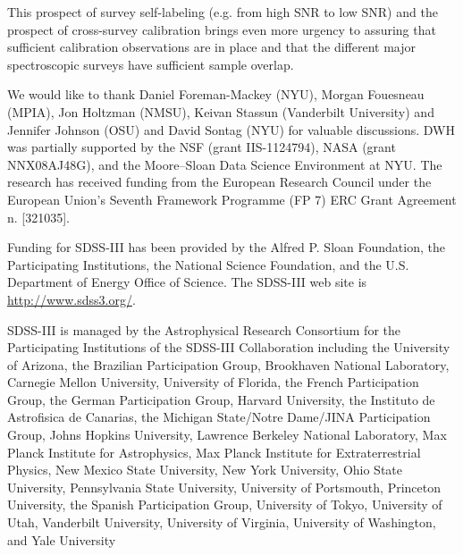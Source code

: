 \documentclass[12pt, preprint]{aastex}
\begin{document}
This prospect of survey self-labeling (e.g. from high SNR to low SNR) and the prospect of cross-survey calibration brings even more urgency to assuring that sufficient calibration observations are in place and that the different major spectroscopic surveys have sufficient sample overlap.

\acknowledgements

We would like to thank Daniel Foreman-Mackey (NYU), 
Morgan Fouesneau (MPIA), Jon Holtzman (NMSU),  Keivan Stassun (Vanderbilt University) and Jennifer Johnson (OSU) and David Sontag (NYU)
for valuable discussions.
DWH was partially supported by
the NSF (grant IIS-1124794), NASA (grant NNX08AJ48G), and the
Moore--Sloan Data Science Environment at NYU.
The research has received funding from the European Research Council under the European
Union's Seventh Framework Programme (FP 7) ERC Grant Agreement n.
[321035].

Funding for SDSS-III has been provided by the Alfred P. Sloan Foundation, the Participating Institutions, 
the National Science Foundation, and the U.S. Department of Energy Office of Science. The SDSS-III web site is \url{http://www.sdss3.org/}.

SDSS-III is managed by the Astrophysical Research Consortium for the Participating Institutions of the SDSS-III Collaboration
 including the University of Arizona, the Brazilian Participation Group, Brookhaven National Laboratory, Carnegie Mellon University, 
 University of Florida, the French Participation Group, the German Participation Group, Harvard University, the Instituto de Astrofisica 
 de Canarias, the Michigan State/Notre Dame/JINA Participation Group, Johns Hopkins University, Lawrence Berkeley National Laboratory, 
 Max Planck Institute for Astrophysics, Max Planck Institute for Extraterrestrial Physics, New Mexico State University, New York University, 
 Ohio State University, Pennsylvania State University, University of Portsmouth, Princeton University, the Spanish Participation Group, 
 University of Tokyo, University of Utah, Vanderbilt University, University of Virginia, University of Washington, and Yale University
\end{document}
